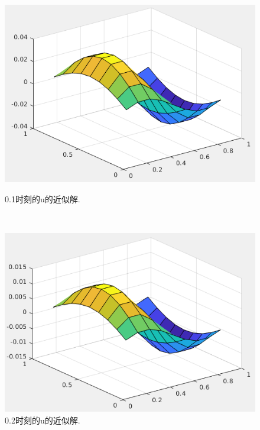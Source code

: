 \documentclass[12pt,a4paper]{article}
\begin{document}
\begin{figure}[ht]
	\begin{minipage}[t]{0.4\linewidth}%
		\centering     %
		\includegraphics[width=1.2\textwidth]{./figures/TIME01.png}
		\caption{0.1时刻的u的近似解.}%
		\label{fig:liuchengtu1}%
	\end{minipage} 
	\hfill
	\begin{minipage}[t]{0.4\linewidth}
		\centering
		\includegraphics[width=1.2\textwidth]{./figures/TIME02.png}
		\caption{0.2时刻的u的近似解.}%
		\label{fig:liuchengtu2}
	\end{minipage}
\end{figure}
\end{document}

